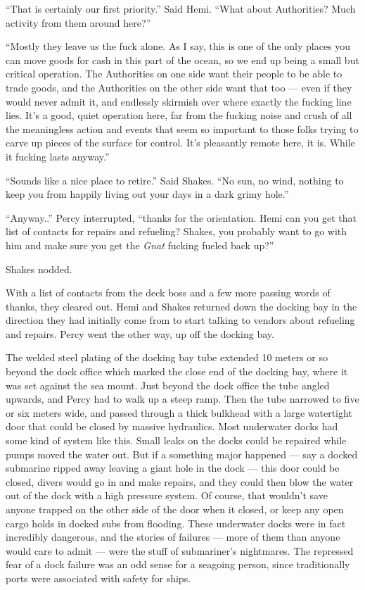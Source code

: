 \documentclass[]{scrbook}
\begin{document}
``That is certainly our first priority.'' Said Hemi. ``What about
Authorities? Much activity from them around here?''

``Mostly they leave us the fuck alone. As I say, this is one of the only
places you can move goods for cash in this part of the ocean, so we end
up being a small but critical operation. The Authorities on one side
want their people to be able to trade goods, and the Authorities on the
other side want that too --- even if they would never admit it, and
endlessly skirmish over where exactly the fucking line lies. It's a
good, quiet operation here, far from the fucking noise and crush of all
the meaningless action and events that seem so important to those folks
trying to carve up pieces of the surface for control. It's pleasantly
remote here, it is. While it fucking lasts anyway.''

``Sounds like a nice place to retire.'' Said Shakes. ``No sun, no wind,
nothing to keep you from happily living out your days in a dark grimy
hole.''

``Anyway..'' Percy interrupted, ``thanks for the orientation. Hemi can
you get that list of contacts for repairs and refueling? Shakes, you
probably want to go with him and make sure you get the \emph{Gnat}
fucking fueled back up?''

Shakes nodded.

With a list of contacts from the deck boss and a few more passing words
of thanks, they cleared out. Hemi and Shakes returned down the docking
bay in the direction they had initially come from to start talking to
vendors about refueling and repairs. Percy went the other way, up off
the docking bay.

The welded steel plating of the docking bay tube extended 10 meters or
so beyond the dock office which marked the close end of the docking bay,
where it was set against the sea mount. Just beyond the dock office the
tube angled upwards, and Percy had to walk up a steep ramp. Then the
tube narrowed to five or six meters wide, and passed through a thick
bulkhead with a large watertight door that could be closed by massive
hydraulics. Most underwater docks had some kind of system like this.
Small leaks on the docks could be repaired while pumps moved the water
out. But if a something major happened --- say a docked submarine ripped
away leaving a giant hole in the dock --- this door could be closed,
divers would go in and make repairs, and they could then blow the water
out of the dock with a high pressure system. Of course, that wouldn't
save anyone trapped on the other side of the door when it closed, or
keep any open cargo holds in docked subs from flooding. These underwater
docks were in fact incredibly dangerous, and the stories of failures ---
more of them than anyone would care to admit --- were the stuff of
submariner's nightmares. The repressed fear of a dock failure was an odd
sense for a seagoing person, since traditionally ports were associated
with safety for ships.
\end{document}
